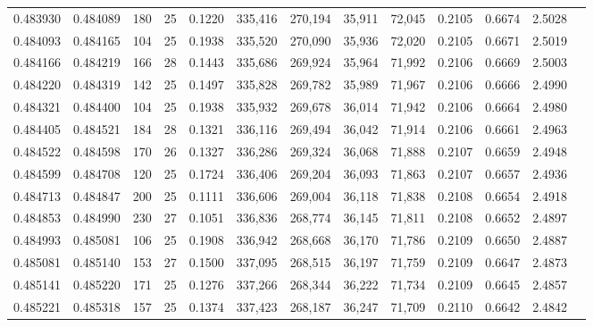 \begin{tabular}{rrrrrrrrrrrrr}
0.483930 & 0.484089 & 180 &  25 &                                     0.1220 & 335,416 & 270,194 &  35,911 &  72,045 & 0.2105 & 0.6674 & 2.5028 \\
0.484093 & 0.484165 & 104 &  25 &                                     0.1938 & 335,520 & 270,090 &  35,936 &  72,020 & 0.2105 & 0.6671 & 2.5019 \\
0.484166 & 0.484219 & 166 &  28 &                                     0.1443 & 335,686 & 269,924 &  35,964 &  71,992 & 0.2106 & 0.6669 & 2.5003 \\
0.484220 & 0.484319 & 142 &  25 &                                     0.1497 & 335,828 & 269,782 &  35,989 &  71,967 & 0.2106 & 0.6666 & 2.4990 \\
0.484321 & 0.484400 & 104 &  25 &                                     0.1938 & 335,932 & 269,678 &  36,014 &  71,942 & 0.2106 & 0.6664 & 2.4980 \\
0.484405 & 0.484521 & 184 &  28 &                                     0.1321 & 336,116 & 269,494 &  36,042 &  71,914 & 0.2106 & 0.6661 & 2.4963 \\
0.484522 & 0.484598 & 170 &  26 &                                     0.1327 & 336,286 & 269,324 &  36,068 &  71,888 & 0.2107 & 0.6659 & 2.4948 \\
0.484599 & 0.484708 & 120 &  25 &                                     0.1724 & 336,406 & 269,204 &  36,093 &  71,863 & 0.2107 & 0.6657 & 2.4936 \\
0.484713 & 0.484847 & 200 &  25 &                                     0.1111 & 336,606 & 269,004 &  36,118 &  71,838 & 0.2108 & 0.6654 & 2.4918 \\
0.484853 & 0.484990 & 230 &  27 &                                     0.1051 & 336,836 & 268,774 &  36,145 &  71,811 & 0.2108 & 0.6652 & 2.4897 \\
0.484993 & 0.485081 & 106 &  25 &                                     0.1908 & 336,942 & 268,668 &  36,170 &  71,786 & 0.2109 & 0.6650 & 2.4887 \\
0.485081 & 0.485140 & 153 &  27 &                                     0.1500 & 337,095 & 268,515 &  36,197 &  71,759 & 0.2109 & 0.6647 & 2.4873 \\
0.485141 & 0.485220 & 171 &  25 &                                     0.1276 & 337,266 & 268,344 &  36,222 &  71,734 & 0.2109 & 0.6645 & 2.4857 \\
0.485221 & 0.485318 & 157 &  25 &                                     0.1374 & 337,423 & 268,187 &  36,247 &  71,709 & 0.2110 & 0.6642 & 2.4842 \\

\end{tabular}
